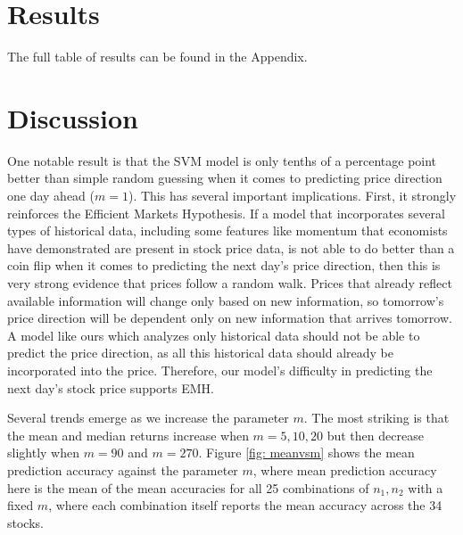 \documentclass[pageno]{jpaper}
\begin{document}
\section{Results}
\label{sec: results}
The full table of results can be found in the Appendix.



\section{Discussion}
One notable result is that the SVM model is only tenths of a percentage point better than simple random guessing when it comes to predicting price direction one day ahead ($m=1$). This has several important implications. First, it strongly reinforces the Efficient Markets Hypothesis. If a model that incorporates several types of historical data, including some features like momentum that economists have demonstrated are present in stock price data, is not able to do better than a coin flip when it comes to predicting the next day's price direction, then this is very strong evidence that prices follow a random walk. Prices that already reflect available information will change only based on new information, so tomorrow's price direction will be dependent only on new information that arrives tomorrow. A model like ours which analyzes only historical data should not be able to predict the price direction, as all this historical data should already be incorporated into the price. Therefore, our model's difficulty in predicting the next day's stock price supports EMH.

Several trends emerge as we increase the parameter $m$. The most striking is that the mean and median returns increase when $m=5,10,20$ but then decrease slightly when $m=90$ and $m=270$. Figure \ref{fig: meanvsm} shows the mean prediction accuracy against the parameter $m$, where mean prediction accuracy here is the mean of the mean accuracies for all 25 combinations of $n_1, n_2$ with a fixed $m$, where each combination itself reports the mean accuracy across the 34 stocks.
\end{document}
